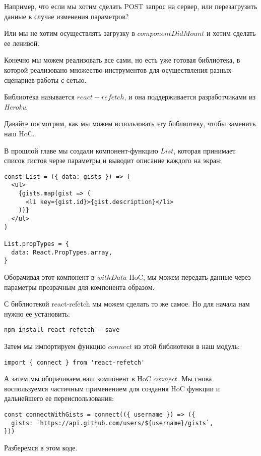 Например, что если мы хотим сделать POST запрос на сервер, или перезагрузить данные в случае изменения параметров?

Или мы не хотим осуществлять загрузку в $componentDidMount$ и хотим сделать ее ленивой.

Конечно мы можем реализовать все сами, но есть уже готовая библиотека, в которой реализовано множество инструментов для осуществления разных сценариев работы с сетью.

Библиотека называется $react-refetch$, и она поддерживается разработчиками из \textit{Heroku}.

Давайте посмотрим, как мы можем использовать эту библиотеку, чтобы заменить наш HoC.

В прошлой главе мы создали компонент-функцию $List$, которая принимает список гистов черзе параметры и выводит описание каждого на экран:

\begin{lstlisting}
const List = ({ data: gists }) => (
  <ul>
    {gists.map(gist => (
      <li key={gist.id}>{gist.description}</li>
    ))} 
  </ul>
)

List.propTypes = {
  data: React.PropTypes.array,
}
\end{lstlisting}

Оборачивая этот компонент в $withData$ HoC, мы можем передать данные через параметры прозрачным для компонента образом. 

С библиотекой react-refetch мы можем сделать то же самое. Но для начала нам нужно ее установить:

\begin{lstlisting}
npm install react-refetch --save
\end{lstlisting}

Затем мы импортируем функцию $connect$ из этой библиотеки в наш модуль:

\begin{lstlisting}
import { connect } from 'react-refetch'
\end{lstlisting}

А затем мы оборачиваем наш компонент в HoC $connect$. Мы снова воспользуемся частичным применением для создания HoC функции и дальнейшего ее переиспользования:

\begin{lstlisting}
const connectWithGists = connect(({ username }) => ({
  gists: `https://api.github.com/users/${username}/gists`,
}))
\end{lstlisting}

Разберемся в этом коде.

